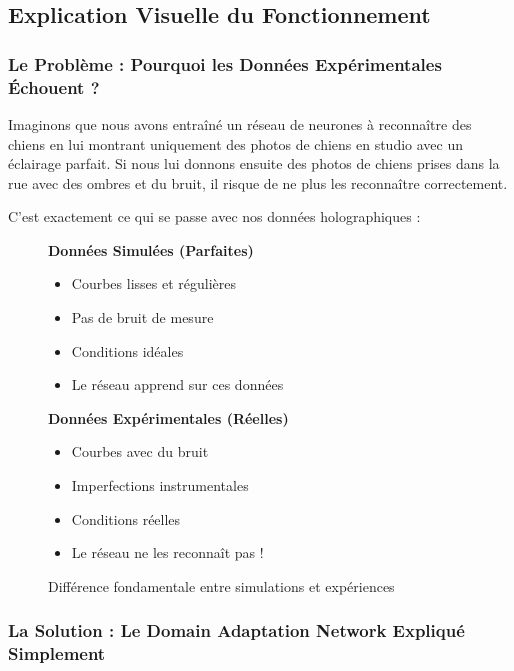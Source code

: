 \documentclass[twocolumn,10pt]{article}
\begin{document}
\subsection{Explication Visuelle du Fonctionnement}

\subsubsection{Le Problème : Pourquoi les Données Expérimentales Échouent ?}

Imaginons que nous avons entraîné un réseau de neurones à reconnaître des chiens en lui montrant uniquement des photos de chiens en studio avec un éclairage parfait. Si nous lui donnons ensuite des photos de chiens prises dans la rue avec des ombres et du bruit, il risque de ne plus les reconnaître correctement.

C'est exactement ce qui se passe avec nos données holographiques :

\begin{figure}[H]
\centering
\begin{minipage}{0.45\textwidth}
\centering
\textbf{Données Simulées (Parfaites)}
\begin{itemize}
\item Courbes lisses et régulières
\item Pas de bruit de mesure
\item Conditions idéales
\item Le réseau apprend sur ces données
\end{itemize}
\end{minipage}
\hfill
\begin{minipage}{0.45\textwidth}
\centering
\textbf{Données Expérimentales (Réelles)}
\begin{itemize}
\item Courbes avec du bruit
\item Imperfections instrumentales
\item Conditions réelles
\item Le réseau ne les reconnaît pas !
\end{itemize}
\end{minipage}
\caption{Différence fondamentale entre simulations et expériences}
\end{figure}

\subsubsection{La Solution : Le Domain Adaptation Network Expliqué Simplement}
\end{document}
